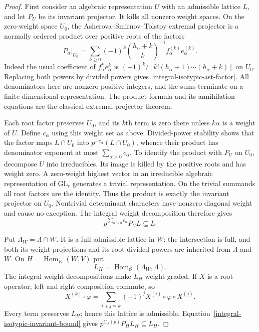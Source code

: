 \begin{proof}
First consider an algebraic representation $U$ with an admissible
lattice $L$, and let $P_U$ be its invariant projector.  It kills all
nonzero weight spaces.  On the zero-weight space $U_0$, the
Asherova--Smirnov--Tolstoy extremal projector is a normally ordered
product over positive roots of the factors
\begin{equation}\label{integral-isotypic-ast-factor}
 P_\alpha\big|_{U_0}
  =\sum_{k\ge0}(-1)^k
       \binom{h_\alpha+k}{k}^{-1}
                  f_\alpha^{(k)}e_\alpha^{(k)}.
\end{equation}
Indeed the usual coefficient of $f_\alpha^k e_\alpha^k$ is
$(-1)^k/[k!(h_\alpha+1)\cdots(h_\alpha+k)]$ on $U_0$.
Replacing both powers by divided powers gives
\eqref{integral-isotypic-ast-factor}.
All denominators here are nonzero positive integers, and the sums
terminate on a finite-dimensional representation.  The product
formula and its annihilation equations are the classical extremal
projector theorem.\cite{ast-extremal-original,tolstoy-extremal-review}

Each root factor preserves $U_0$, and its $k$th term is zero there
unless $k\alpha$ is a weight of $U$.  Define $c_\alpha$ using this
weight set as above.  Divided-power stability shows that the factor
maps $L\cap U_0$ into $p^{-c_\alpha}(L\cap U_0)$, whence their product
has denominator exponent at most $\sum_{\alpha>0}c_\alpha$.
To identify the product with $P_U$ on $U_0$, decompose $U$ into
irreducibles.  Its image is killed by the positive roots and has
weight zero.  A zero-weight highest vector in an irreducible
algebraic representation of $\mathrm{GL}_r$ generates a trivial
representation.  On the trivial summands all root factors are the
identity.  Thus the product is exactly the invariant projector on
$U_0$.  Nontrivial determinant characters have nonzero diagonal
weight and cause no exception.  The integral weight decomposition
therefore gives
\begin{equation}\label{integral-isotypic-invariant-bound}
                p^{\sum_{\alpha>0}c_\alpha}P_U L\subseteq L.
\end{equation}

Put $\Lambda_W=\Lambda\cap W$.  It is a full admissible lattice in
$W$: the intersection is full, and both its weight projections and
its root divided powers are inherited from $\Lambda$ and $W$.
On $H=\operatorname{Hom}_K(W,V)$ put
\[
                 L_H=\operatorname{Hom}_{\mathcal O}
                                      (\Lambda_W,\Lambda).
\]
The integral weight decompositions make $L_H$ weight graded.  If
$X$ is a root operator, left and right composition commute, so
\[
 X^{(k)}\cdot\varphi
    =\sum_{i+j=k}(-1)^j X^{(i)}\circ\varphi\circ X^{(j)}.
\]
Every term preserves $L_H$; hence this lattice is admissible.
Equation~\eqref{integral-isotypic-invariant-bound} gives
$p^{C_\lambda(p)}P_H L_H\subseteq L_H$.


\end{proof}
